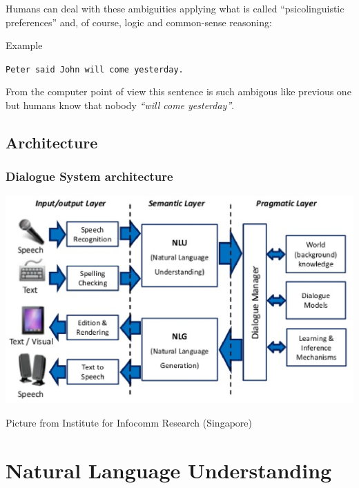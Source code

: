 \documentclass[11pt]{beamer}
\begin{document}
\begin{frame}
	Humans can deal with these ambiguities applying what is called ``psicolinguistic preferences'' and, of course, logic and common-sense reasoning:
	\vspace{10pt}
	\pause
	\begin{block}{Example}
		\begin{center}
		\vspace{10pt}
		\texttt{Peter said John will come yesterday.}
		\vspace{10pt}
		\end{center}
	\end{block}
	\vspace{10pt}
	\pause
	From the computer point of view this sentence is such ambigous like previous one but humans know that nobody \textsl{``will come yesterday''}.
\end{frame}

\subsection{Architecture}

\begin{frame}
\frametitle{Dialogue System architecture}
	\begin{center}
		\includegraphics[width=1.00\textwidth]{ds.eps}
		\begin{tiny}
			Picture from Institute for Infocomm Research (Singapore)
		\end{tiny}
	\end{center}
\end{frame}

\section{Natural Language Understanding}
\end{document}
